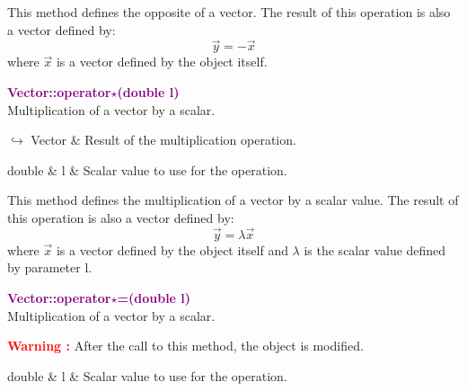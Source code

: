 This method defines the opposite of a vector.
The result of this operation is also a vector defined by:
\begin{equation*}
\overrightarrow{y} = - \overrightarrow{x}
\end{equation*}
where $\overrightarrow{x}$ is a vector defined by the object itself.

\textcolor{purple}{\textbf{Vector::operator$\star$(double l)}}\label{Vector::operator*(double l)}\\
Multiplication of a vector by a scalar.\vspace*{-0.5em}
\begin{tcolorbox}[grow to left by=-1cm, width=\textwidth-1cm,myArgs,tabularx={l|R}]
$\hookrightarrow$ Vector & Result of the multiplication operation.
\end{tcolorbox}

\begin{tcolorbox}[width=\textwidth,myArgs,tabularx={ll|R}]
double & l & Scalar value to use for the operation.
\end{tcolorbox}

This method defines the multiplication of a vector by a scalar value.
The result of this operation is also a vector defined by:
\begin{equation*}
\overrightarrow{y} = \lambda \overrightarrow{x}
\end{equation*}
where $\overrightarrow{x}$ is a vector defined by the object itself and $\lambda$ is the scalar value defined by parameter l.

\textcolor{purple}{\textbf{Vector::operator$\star$=(double l)}}\label{Vector::operator*=(double l)}\\
Multiplication of a vector by a scalar.

\hspace*{10mm}\textcolor{red}{\textbf{Warning :}} After the call to this method, the object is modified.

\begin{tcolorbox}[width=\textwidth,myArgs,tabularx={ll|R}]
double & l & Scalar value to use for the operation.
\end{tcolorbox}

